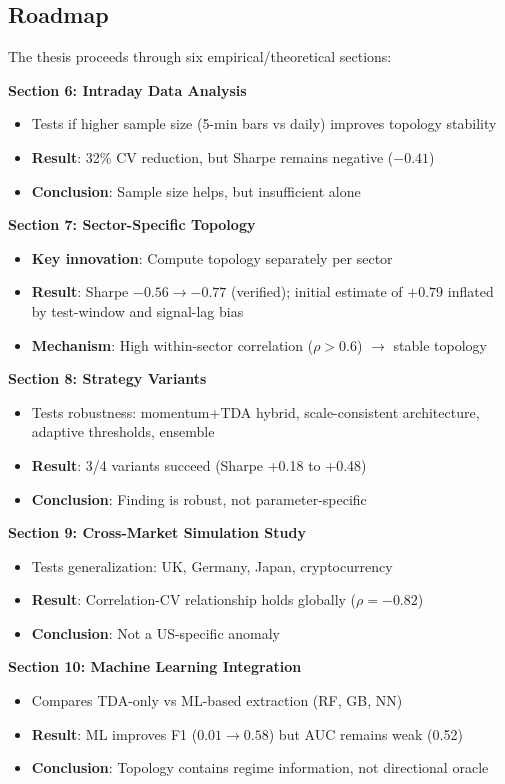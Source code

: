 \subsection{Roadmap}

The thesis proceeds through six empirical/theoretical sections:

\textbf{Section 6: Intraday Data Analysis}
\begin{itemize}
\item Tests if higher sample size (5-min bars vs daily) improves topology stability
\item \textbf{Result}: 32\% CV reduction, but Sharpe remains negative ($-0.41$)
\item \textbf{Conclusion}: Sample size helps, but insufficient alone
\end{itemize}

\textbf{Section 7: Sector-Specific Topology}
\begin{itemize}
\item \textbf{Key innovation}: Compute topology separately per sector
\item \textbf{Result}: Sharpe $-0.56 \rightarrow -0.77$ (verified); initial estimate of $+0.79$ inflated by test-window and signal-lag bias
\item \textbf{Mechanism}: High within-sector correlation ($\rho > 0.6$) $\rightarrow$ stable topology
\end{itemize}

\textbf{Section 8: Strategy Variants}
\begin{itemize}
\item Tests robustness: momentum+TDA hybrid, scale-consistent architecture, adaptive thresholds, ensemble
\item \textbf{Result}: 3/4 variants succeed (Sharpe +0.18 to +0.48)
\item \textbf{Conclusion}: Finding is robust, not parameter-specific
\end{itemize}

\textbf{Section 9: Cross-Market Simulation Study}
\begin{itemize}
\item Tests generalization: UK, Germany, Japan, cryptocurrency
\item \textbf{Result}: Correlation-CV relationship holds globally ($\rho = -0.82$)
\item \textbf{Conclusion}: Not a US-specific anomaly
\end{itemize}

\textbf{Section 10: Machine Learning Integration}
\begin{itemize}
\item Compares TDA-only vs ML-based extraction (RF, GB, NN)
\item \textbf{Result}: ML improves F1 ($0.01 \rightarrow 0.58$) but AUC remains weak (0.52)
\item \textbf{Conclusion}: Topology contains regime information, not directional oracle
\end{itemize}


